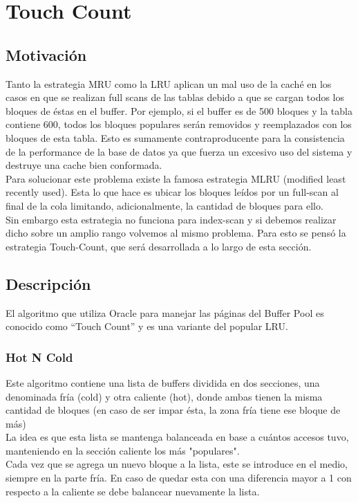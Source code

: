 \section{Touch Count}

\subsection{Motivación}

Tanto la estrategia MRU como la LRU aplican un mal uso de la caché en los casos en que se realizan full scans de las tablas
debido a que se cargan todos los bloques de éstas en el buffer. Por ejemplo, si el buffer es de 500 bloques y la tabla contiene 600,
todos los bloques populares serán removidos y reemplazados con los bloques de esta tabla. Esto es sumamente contraproducente para la consistencia de la performance de la base de datos ya que fuerza un excesivo uso del sistema y destruye una cache bien conformada.
\\
Para solucionar este problema existe la famosa estrategia MLRU (modified least recently used). Esta lo que hace es ubicar los bloques
leídos por un full-scan al final de la cola limitando, adicionalmente, la cantidad de bloques para ello.
\\
Sin embargo esta estrategia no funciona para index-scan y si debemos realizar dicho sobre un amplio rango volvemos al mismo problema. Para
esto se pensó la estrategia Touch-Count, que será desarrollada a lo largo de esta sección.

\subsection{Descripción}
El algoritmo que utiliza Oracle para manejar las páginas del Buffer Pool es conocido
como “Touch Count” y es una variante del popular LRU.

\subsubsection{Hot N Cold}

Este algoritmo contiene una lista de buffers dividida en dos secciones, una denominada fría (cold) y otra caliente (hot), donde ambas tienen la misma cantidad de bloques (en caso de ser impar ésta, la zona fría tiene ese bloque de más)\\
La idea es que esta lista se mantenga balanceada en base a cuántos accesos tuvo, manteniendo en la sección caliente los más "populares". \\
Cada vez que se agrega un nuevo bloque a la lista, este se introduce en el medio, siempre en la parte fría. En caso de quedar esta con una diferencia mayor a 1 con respecto a la caliente se debe balancear nuevamente la lista.\\

